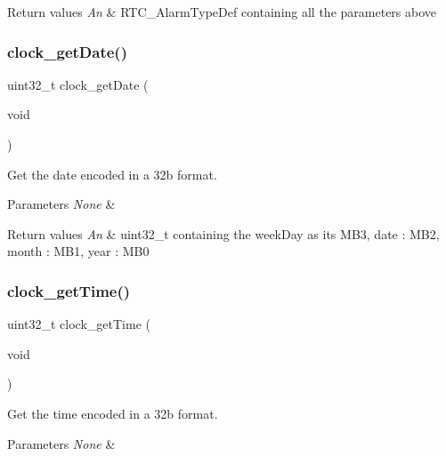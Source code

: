 \begin{DoxyRetVals}{Return values}
{\em An} & R\+T\+C\+\_\+\+Alarm\+Type\+Def containing all the parameters above \\
\hline
\end{DoxyRetVals}
\mbox{\label{group___clock_gabb4d72928cb3d131d40067fb141003aa}} 
\subsubsection{\texorpdfstring{clock\+\_\+get\+Date()}{clock\_getDate()}}
{\footnotesize\ttfamily uint32\+\_\+t clock\+\_\+get\+Date (\begin{DoxyParamCaption}\item[{void}]{ }\end{DoxyParamCaption})}



Get the date encoded in a 32b format. 


\begin{DoxyParams}{Parameters}
{\em None} & \\
\hline
\end{DoxyParams}

\begin{DoxyRetVals}{Return values}
{\em An} & uint32\+\_\+t containing the week\+Day as its M\+B3, date \+: M\+B2, month \+: M\+B1, year \+: M\+B0 \\
\hline
\end{DoxyRetVals}
\mbox{\label{group___clock_ga03ae6948083c259f6edc0b146f40dc62}} 
\subsubsection{\texorpdfstring{clock\+\_\+get\+Time()}{clock\_getTime()}}
{\footnotesize\ttfamily uint32\+\_\+t clock\+\_\+get\+Time (\begin{DoxyParamCaption}\item[{void}]{ }\end{DoxyParamCaption})}



Get the time encoded in a 32b format. 


\begin{DoxyParams}{Parameters}
{\em None} & \\
\hline
\end{DoxyParams}

